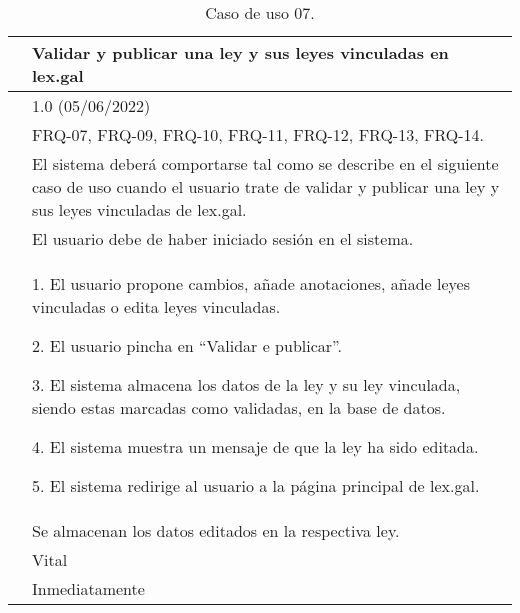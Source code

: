 \begin{table}[H]
\begin{center}
\begin{tabular}{|p{3cm}|p{10cm}|} \hline
\centering {\bf UC-07} & Validar y publicar una ley y sus leyes vinculadas en lex.gal  \\ \hline\hline
\centering {\bf Versión} & 1.0 (05/06/2022) \\ \hline
\centering {\bf Dependencias} & FRQ-07, FRQ-09, FRQ-10, FRQ-11, FRQ-12, FRQ-13, FRQ-14. \\ \hline
\centering {\bf Descripción} &  El sistema deberá comportarse tal como se describe en el siguiente caso de uso cuando el usuario trate de validar y publicar una ley y sus leyes vinculadas de lex.gal. \\ \hline
\centering {\bf Precondición} &  El usuario debe de haber iniciado sesión en el sistema. \\ \hline
\centering {\bf Secuencia normal} &  
1. El usuario propone cambios, añade anotaciones, añade leyes vinculadas o edita leyes vinculadas.

2. El usuario pincha en ``Validar e publicar''.

3. El sistema almacena los datos de la ley y su ley vinculada, siendo estas marcadas como validadas, en la base de datos.

4. El sistema muestra un mensaje de que la ley ha sido editada.

5. El sistema redirige al usuario a la página principal de lex.gal.
\\ \hline
\centering {\bf Postcondición} &  Se almacenan los datos editados en la respectiva ley. \\ \hline
\centering {\bf Importancia} & Vital \\ \hline
\centering {\bf Urgencia} & Inmediatamente \\ \hline
\end{tabular}
\caption{Caso de uso 07.}
\label{enlaceUC7}
\end{center}
\end{table}

